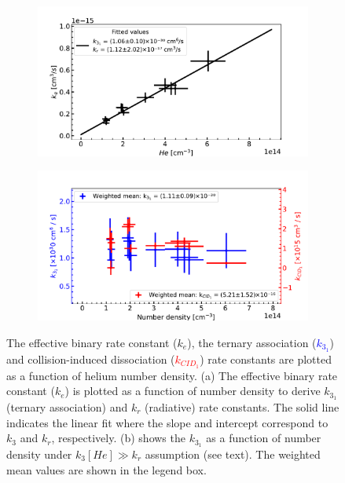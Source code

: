 \begin{figure}[!htb]
    \centering
    \begin{subfigure}[b]{0.49\textwidth}
        \centering
        \includegraphics[width=1\textwidth]{figures/measurements/kinetics/functionOf_nHe/off_4.8K_k31_effective_rate_constants.pdf}
        
        \caption{}
        \label{fig:off:effective-rate-constants}
    \end{subfigure}
    \hfill
    \begin{subfigure}[b]{0.49\textwidth}
        \centering
        \includegraphics[width=1\textwidth]{figures/measurements/kinetics/functionOf_nHe/off_4.8K_k3_kCID_1_as_functionOfnHe.pdf}
        \caption{}
        \label{fig:off:rate-constants}
    \end{subfigure}
    
    \caption{The effective binary rate constant ($k_e$), the ternary association (\textcolor{blue}{$k_{3_1}$}) and collision-induced dissociation (\textcolor{red}{$k_{CID_1}$}) rate constants are plotted as a function of helium number density. (a) The effective binary rate constant ($k_e$) is plotted as a function of number density to derive $k_{3_1}$ (ternary association) and $k_r$ (radiative) rate constants. The solid line indicates the linear fit where the slope and intercept correspond to $k_3$ and $k_r$, respectively. (b) shows the $k_{3_1}$ as a function of number density under $k_3[He] \gg k_r$ assumption (see text). The weighted mean values are shown in the legend box.}

\end{figure}
